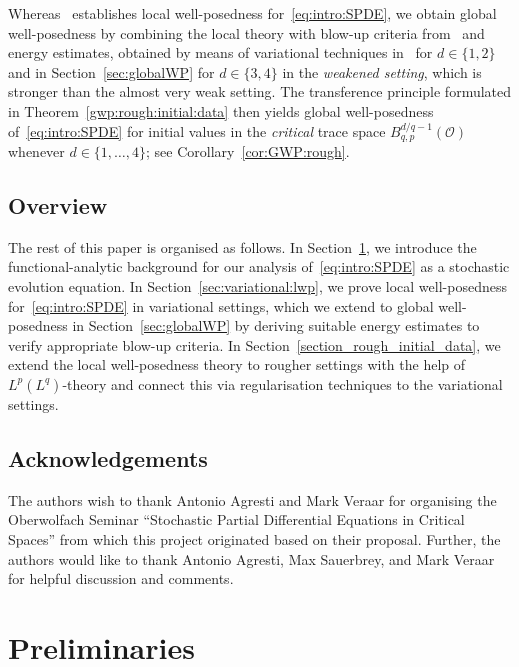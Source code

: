 \documentclass[reqno]{amsart}
\newcommand{\sO}{\mathscr{O}}
\newcommand{\1}{\mathbf{1}}
\begin{document}
Whereas~\cite[Section 7.3]{agrestiNonlinearParabolicStochastic2022} establishes local well-posedness for~\eqref{eq:intro:SPDE}, we obtain global well-posedness by combining the local theory with blow-up criteria from~\cite[Theorem 4.10]{agrestiNonlinearParabolicStochastic2022a} and energy estimates, obtained by means of variational techniques in~\cite{agrestiCriticalVariationalSetting2024a} for $d\in\{1,2\}$ and in Section~\ref{sec:globalWP} for $d\in\{3,4\}$ in the \textit{weakened setting}, which is stronger than the almost very weak setting. The transference principle formulated in Theorem~\ref{gwp:rough:initial:data} then yields global well-posedness of~\eqref{eq:intro:SPDE} for initial values in the \emph{critical} trace space $B_{q,p}^{d/q-1}(\sO)$ whenever $d\in \{1,\dots,4\}$; see Corollary~\ref{cor:GWP:rough}.


\subsection*{Overview}
The rest of this paper is organised as follows. In Section~\ref{sec:preliminaries}, we introduce the functional-analytic background for our analysis of~\eqref{eq:intro:SPDE} as a stochastic evolution equation. In Section~\ref{sec:variational:lwp}, we prove local well-posedness for~\eqref{eq:intro:SPDE} in variational settings, which we extend to global well-posedness in Section~\ref{sec:globalWP} by deriving suitable energy estimates to verify appropriate blow-up criteria. In Section~\ref{section_rough_initial_data}, we extend the local well-posedness theory to rougher settings with the help of $L^p(L^q)$-theory and connect this via regularisation techniques to the variational settings.

\subsection*{Acknowledgements}

The authors wish to thank Antonio Agresti and Mark Veraar for organising the Oberwolfach Seminar ``Stochastic Partial Differential Equations in Critical Spaces'' from which this project originated based on their proposal.  Further, the authors would like to thank Antonio Agresti, Max Sauerbrey, and Mark Veraar for helpful discussion and comments. 

\section{Preliminaries}\label{sec:preliminaries}
\end{document}
